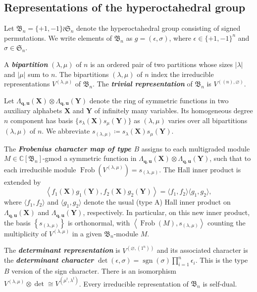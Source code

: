\documentclass[11pt, reqno]{amsart}
\theoremstyle{definition}
\theoremstyle{remark}
\numberwithin{equation}{section}
\newcommand{\0}{\emptyset}
\newcommand{\C}{\mathbb{C}}
\DeclareMathOperator{\Frob}{Frob}
\DeclareMathOperator{\sgn}{sgn}
\newcommand{\newword}[1]{\emph{\textbf{#1}}}
\begin{document}
\subsection{Representations of the hyperoctahedral group}\label{subsec:B-basics}
Let $\mathfrak{B}_n = \{+1,-1\} \wr \mathfrak{S}_n$ denote the hyperoctahedral group consisting of signed permutations. 
We write elements of $\mathfrak{B}_n$ as $g = (\epsilon, \sigma)$, where $\epsilon \in \{+1,-1\}^n$ and $\sigma \in \mathfrak{S}_n$.

A \newword{bipartition} $(\lambda, \mu)$ of $n$ is an ordered pair of two partitions whose sizes $|\lambda|$ and $|\mu|$ sum to $n$.
The bipartitions $(\lambda, \mu)$ of $n$ index the irreducible representations $V^{(\lambda, \mu)}$ of $\mathfrak{B}_n$.
The \newword{trivial representation} of $\mathfrak{B}_n$ is $V^{((n),\varnothing)}$.

Let $\Lambda_{\mathbf{q},\mathbf{u}}(\mathbf{X})\otimes \Lambda_{\mathbf{q},\mathbf{u}}(\mathbf{Y})$ denote the ring of symmetric functions in two auxiliary alphabets $\mathbf{X}$ and $\mathbf{Y}$ of infinitely many variables. 
Its homogeneous degree $n$ component has basis $\{s_\lambda(\mathbf{X}) s_\mu(\mathbf{Y})\}$ as $(\lambda, \mu)$ varies over all bipartitions $(\lambda,\mu)$ of $n$. We abbreviate $s_{(\lambda,\mu)} \coloneqq s_\lambda(\mathbf{X}) s_\mu(\mathbf{Y})$.

The \newword{Frobenius character map of type $B$} assigns to each multigraded module 
$M \in \C[\mathfrak{B}_n]$-gmod a symmetric function in 
$\Lambda_{\mathbf{q},\mathbf{u}}(\mathbf{X})\otimes \Lambda_{\mathbf{q},\mathbf{u}}(\mathbf{Y})$, 
such that to each irreducible module $\Frob\left(V^{(\lambda,\mu)}\right) = s_{(\lambda,\mu)}$. 
The Hall inner product is extended by 
\[
    \left\langle f_1(\mathbf{X}) g_1(\mathbf{Y}), f_2(\mathbf{X}) g_2(\mathbf{Y}) \right\rangle 
    = \langle f_1,f_2\rangle \langle g_1, g_2\rangle,
\]
where $\langle f_1,f_2\rangle$ and $\langle g_1, g_2\rangle$ denote 
the usual (type A) Hall inner product on $\Lambda_{\mathbf{q},\mathbf{u}}(\mathbf{X})$ 
and $\Lambda_{\mathbf{q},\mathbf{u}}(\mathbf{Y})$, respectively.
In particular, on this new inner product, the basis $\left\{s_{(\lambda,\mu)}\right\}$ 
is orthonormal, 
with $\left\langle \Frob(M), s_{(\lambda,\mu)} \right\rangle$ counting 
the multiplicity of $V^{(\lambda, \mu)}$ in a given $\mathfrak{B}_n$-module $M$.

The \newword{determinant representation} is $V^{(\varnothing, (1^n))}$ and its associated character is the \newword{determinant character} $\det(\epsilon, \sigma) = \sgn(\sigma) \prod_{i=1}^n \epsilon_i$. This is the type $B$ version of the sign character.
There is an isomorphism $V^{(\lambda,\mu)} \otimes \det \cong V^{(\mu^t,\lambda^t)}$. Every irreducible representation of $\mathfrak{B}_n$ is self-dual.
\end{document}
